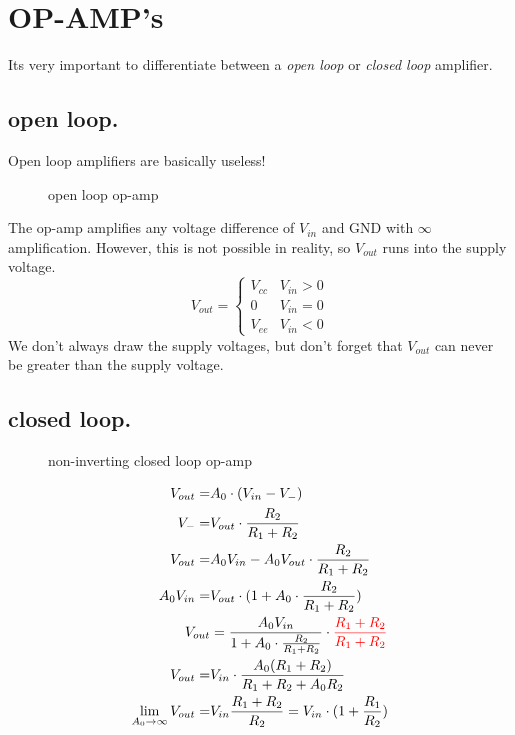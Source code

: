 \documentclass[11ypt]{extarticle}
\begin{document}
\section{OP-AMP's}

Its very important to differentiate between a \textit{open loop} or \textit{closed loop} amplifier.

\subsection{open loop.}

Open loop amplifiers are basically useless!

\begin{figure}[H]{} 
    \centering
    
    \caption{open loop op-amp}
\end{figure}

The op-amp amplifies any voltage difference of $V_{in}$ and GND with $\infty$ amplification. However, this is not possible in reality, so $V_{out}$ runs into the supply voltage.
\begin{equation}
    V_{out} = 
    \begin{cases}
        {V_{cc}} & {V_{in} > 0} \\
        0     & {V_{in} = 0} \\
        {V_{ee}} & {V_{in} < 0}
    \end{cases}      
\end{equation}
We don't always draw the supply voltages, but don't forget that $V_{out}$ can never be greater than the supply voltage.

\subsection{closed loop.}

\begin{figure}[H]{} 
    \centering
	
    \caption{non-inverting closed loop op-amp}
\end{figure}

\begin{equation}
\begin{aligned}
    V_{out} =& A_0 \cdot (V_{in} - V_-)
    \\
    V_- =& V_{out} \cdot \frac{R_2}{R_1 + R_2}
    \\
    V_{out} =& A_0 V_{in} - A_0 V_{out} \cdot \frac{R_2}{R_1 + R_2}
    \\
    A_0 V_{in} =& V_{out} \cdot (1 + A_0 \cdot \frac{R_2}{R_1 + R_2}) 
    \\
    V_{out} &= \frac{A_0 V_{in}} {1 + A_0 \cdot \frac{R_2}{R_1 + R_2}} \cdot \color{red}{ \frac{R_1 + R_2}{R_1 + R_2}}
    \\
    V_{out} =& V_{in} \cdot \frac{A_0 (R_1 + R_2)}{R_1 + R_2 + A_0 R_2}
    \\
    \lim_{A_0\to\infty} V_{out} =& V_{in}\frac{R_1 + R_2}{R_2} = V_{in} \cdot (1 + \frac{R_1}{R_2})
\end{aligned}
\end{equation}
\end{document}
